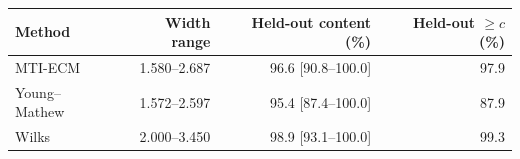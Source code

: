 \begin{tabular}{@{}lrrr@{}}
\toprule
Method & Width range & Held-out content (\%) & Held-out $\ge c$ (\%)\\
\midrule
MTI-ECM & 1.580--2.687 & 96.6 [90.8--100.0] & 97.9\\
Young--Mathew & 1.572--2.597 & 95.4 [87.4--100.0] & 87.9\\
Wilks & 2.000--3.450 & 98.9 [93.1--100.0] & 99.3\\
\bottomrule
\end{tabular}
